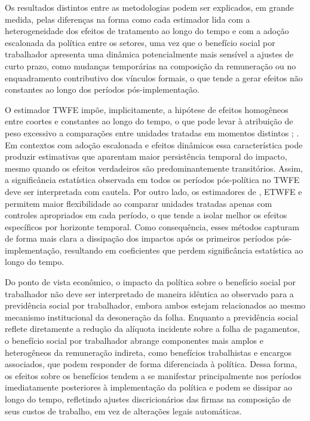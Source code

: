 \documentclass[12pt,a4paper,oneside]{article}
\begin{document}
		
		Os resultados distintos entre as metodologias podem ser explicados, em grande medida, pelas diferenças na forma como cada estimador lida com a heterogeneidade dos efeitos de tratamento ao longo do tempo e com a adoção escalonada da política entre os setores, uma vez que o benefício social por trabalhador apresenta uma dinâmica potencialmente mais sensível a ajustes de curto prazo, como mudanças temporárias na composição da remuneração ou no enquadramento contributivo dos vínculos formais, o que tende a gerar efeitos não constantes ao longo dos períodos pós-implementação.
		
		O estimador TWFE impõe, implicitamente, a hipótese de efeitos homogêneos entre coortes e constantes ao longo do tempo, o que pode levar à atribuição de peso excessivo a comparações entre unidades tratadas em momentos distintos \citep{DeChaisemartin2020}; \citep{Sun2021}. Em contextos com adoção escalonada e efeitos dinâmicos essa característica pode produzir estimativas que aparentam maior persistência temporal do impacto, mesmo quando os efeitos verdadeiros são predominantemente transitórios. Assim, a significância estatística observada em todos os períodos pós-política no TWFE deve ser interpretada com cautela. Por outro lado, os estimadores de \citet{Callaway2021}, ETWFE e \citet{Sun2021} permitem maior flexibilidade ao comparar unidades tratadas apenas com controles apropriados em cada período, o que tende a isolar melhor os efeitos específicos por horizonte temporal. Como consequência, esses métodos capturam de forma mais clara a dissipação dos impactos após os primeiros períodos pós-implementação, resultando em coeficientes que perdem significância estatística ao longo do tempo. 
		
		Do ponto de vista econômico, o impacto da política sobre o benefício social por trabalhador não deve ser interpretado de maneira idêntica ao observado para a previdência social por trabalhador, embora ambos estejam relacionados ao mesmo mecanismo institucional da desoneração da folha. Enquanto a previdência social reflete diretamente a redução da alíquota incidente sobre a folha de pagamentos, o benefício social por trabalhador abrange componentes mais amplos e heterogêneos da remuneração indireta, como benefícios trabalhistas e encargos associados, que podem responder de forma diferenciada à política. Dessa forma, os efeitos sobre os benefícios tendem a se manifestar principalmente nos períodos imediatamente posteriores à implementação da política e podem se dissipar ao longo do tempo, refletindo ajustes discricionários das firmas na composição de seus custos de trabalho, em vez de alterações legais automáticas.
		
\end{document}

